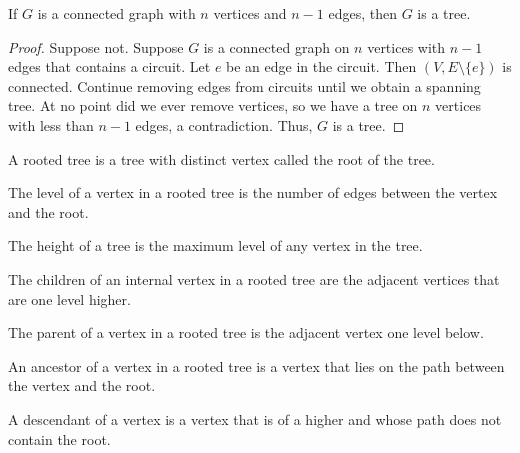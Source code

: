             \begin{theorem}
                If $G$ is a connected graph with $n$ vertices and
                $n-1$ edges, then $G$ is a tree.
            \end{theorem}
            \begin{proof}
                Suppose not. Suppose $G$ is a connected graph
                on $n$ vertices with $n-1$ edges that contains a
                circuit. Let $e$ be an edge in the circuit.
                Then $(V,E\setminus\{e\})$ is connected. Continue removing
                edges from circuits until we obtain a spanning tree.
                At no point did we ever remove vertices, so we have
                a tree on $n$ vertices with less than $n-1$ edges,
                a contradiction. Thus, $G$ is a tree.
            \end{proof}
            \begin{definition}
                A rooted tree is a tree with distinct vertex
                called the root of the tree.
            \end{definition}
            \begin{definition}
                The level of a vertex in a rooted tree is the number
                of edges between the vertex and the root.
            \end{definition}
            \begin{definition}
                The height of a tree is the maximum level of any
                vertex in the tree.
            \end{definition}
            \begin{definition}
                The children of an internal vertex in a rooted tree
                are the adjacent vertices that are one level
                higher.
            \end{definition}
            \begin{definition}
                The parent of a vertex in a rooted tree is
                the adjacent vertex one level below.
            \end{definition}
            \begin{definition}
                An ancestor of a vertex in a rooted tree is a vertex
                that lies on the path between the vertex and the root.
            \end{definition}
            \begin{definition}
                A descendant of a vertex is a vertex that is of a higher
                and whose path does not contain the root.
            \end{definition}
